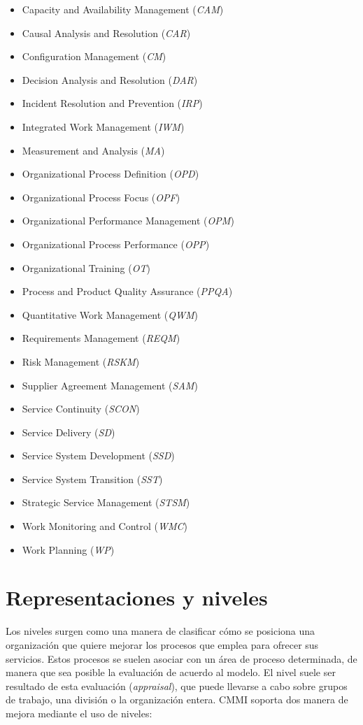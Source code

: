\begin{itemize}
\begin{itemize}
	\item Capacity and Availability Management (\textit{CAM})
	\item Causal Analysis and Resolution (\textit{CAR})
	\item Configuration Management (\textit{CM})
	\item Decision Analysis and Resolution (\textit{DAR})
	\item Incident Resolution and Prevention (\textit{IRP})
	\item Integrated Work Management (\textit{IWM})
	\item Measurement and Analysis (\textit{MA})
	\item Organizational Process Definition (\textit{OPD})
	\item Organizational Process Focus (\textit{OPF})
	\item Organizational Performance Management (\textit{OPM})
	\item Organizational Process Performance (\textit{OPP})
	\item Organizational Training (\textit{OT})
	\item Process and Product Quality Assurance (\textit{PPQA})
	\item Quantitative Work Management (\textit{QWM})
	\item Requirements Management (\textit{REQM})
	\item Risk Management (\textit{RSKM})
	\item Supplier Agreement Management (\textit{SAM})
	\item Service Continuity (\textit{SCON})
	\item Service Delivery (\textit{SD})
	\item Service System Development (\textit{SSD})
	\item Service System Transition (\textit{SST})
	\item Strategic Service Management (\textit{STSM})
	\item Work Monitoring and Control (\textit{WMC})
	\item Work Planning (\textit{WP})
\end{itemize}


\section{Representaciones y niveles}
Los niveles surgen como una manera de clasificar cómo se posiciona una organización que quiere mejorar los procesos que emplea para ofrecer sus servicios. Estos procesos se suelen asociar con un área de proceso determinada, de manera que sea posible la evaluación de acuerdo al modelo. El nivel suele ser  resultado de esta evaluación (\textit{appraisal}), que puede llevarse a cabo sobre grupos de trabajo, una división o la organización entera. CMMI soporta dos manera de mejora mediante el uso de niveles:


\end{itemize}
